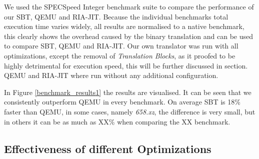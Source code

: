 \documentclass[course=eragp]{aspdoc}
\begin{document}
We used the SPECSpeed Integer benchmark suite to compare the performance of our SBT, QEMU and RIA-JIT.
Because the individual benchmarks total execution time varies widely, all results are normalised to a native benchmark, this clearly shows the overhead caused by the binary translation and can be used to compare SBT, QEMU and RIA-JIT.
Our own translator was run with all optimizations, except the removal of \emph{Translation Blocks}, as it proofed to be highly detrimental for execution speed, this will be further discussed in section. %
QEMU and RIA-JIT where run without any additional configuration.

\par

In Figure \ref{benchmark_results1} the results are visualised.
It can be seen that we consistently outperform QEMU in every benchmark.
On average SBT is 18\% faster than QEMU, in some cases, namely \emph{658.xz}, the difference is very small, but in others it can be as much as XX\% when comparing the XX benchmark.


\par



\subsection{Effectiveness of different Optimizations}
\end{document}
